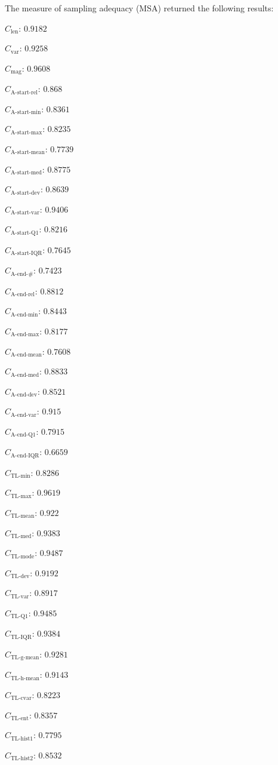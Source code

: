 \documentclass[a4paper]{article}
\newcommand{\magnitudename}{\text{mag}}
\newcommand{\magnitude}{C_{\magnitudename}}
\newcommand{\varietyname}{\text{var}}
\newcommand{\variety}{C_{\varietyname}}
\newcommand{\lengthname}{\text{len}}
\newcommand{\length}{C_{\lengthname}}
\newcommand{\startactivitiesrelname}{\text{A-start-rel}}
\newcommand{\startactivitiesrel}{C_{\startactivitiesrelname}}
\newcommand{\startminname}{\text{A-start-min}}
\newcommand{\startmin}{C_{\startminname}}
\newcommand{\startmaxname}{\text{A-start-max}}
\newcommand{\startmax}{C_{\startmaxname}}
\newcommand{\startmeanname}{\text{A-start-mean}}
\newcommand{\startmean}{C_{\startmeanname}}
\newcommand{\startmedianname}{\text{A-start-med}}
\newcommand{\startmedian}{C_{\startmedianname}}
\newcommand{\startdevname}{\text{A-start-dev}}
\newcommand{\startdev}{C_{\startdevname}}
\newcommand{\startvarname}{\text{A-start-var}}
\newcommand{\startvar}{C_{\startvarname}}
\newcommand{\startqonename}{\text{A-start-Q1}}
\newcommand{\startqone}{C_{\startqonename}}
\newcommand{\startiqrname}{\text{A-start-IQR}}
\newcommand{\startiqr}{C_{\startiqrname}}
\newcommand{\lastactivitiesname}{\text{A-end-\#}}
\newcommand{\lastactivities}{C_{\lastactivitiesname}}
\newcommand{\lastactivitiesrelname}{\text{A-end-rel}}
\newcommand{\lastactivitiesrel}{C_{\lastactivitiesrelname}}
\newcommand{\lastminname}{\text{A-end-min}}
\newcommand{\lastmin}{C_{\lastminname}}
\newcommand{\lastmaxname}{\text{A-end-max}}
\newcommand{\lastmax}{C_{\lastmaxname}}
\newcommand{\lastmeanname}{\text{A-end-mean}}
\newcommand{\lastmean}{C_{\lastmeanname}}
\newcommand{\lastmedianname}{\text{A-end-med}}
\newcommand{\lastmedian}{C_{\lastmedianname}}
\newcommand{\lastdevname}{\text{A-end-dev}}
\newcommand{\lastdev}{C_{\lastdevname}}
\newcommand{\lastvarname}{\text{A-end-var}}
\newcommand{\lastvar}{C_{\lastvarname}}
\newcommand{\lastqonename}{\text{A-end-Q1}}
\newcommand{\lastqone}{C_{\lastqonename}}
\newcommand{\lastiqrname}{\text{A-end-IQR}}
\newcommand{\lastiqr}{C_{\lastiqrname}}
\newcommand{\tlminname}{\text{TL-min}}
\newcommand{\tlmin}{C_{\tlminname}}
\newcommand{\tlavgname}{\text{TL-mean}}
\newcommand{\tlavg}{C_{\tlavgname}}
\newcommand{\tlmaxname}{\text{TL-max}}
\newcommand{\tlmax}{C_{\tlmaxname}}
\newcommand{\tlmedname}{\text{TL-med}}
\newcommand{\tlmed}{C_{\tlmedname}}
\newcommand{\tlmodename}{\text{TL-mode}}
\newcommand{\tlmode}{C_{\tlmodename}}
\newcommand{\tldevname}{\text{TL-dev}}
\newcommand{\tldev}{C_{\tldevname}}
\newcommand{\tlvarname}{\text{TL-var}}
\newcommand{\tlvar}{C_{\tlvarname}}
\newcommand{\tlqonename}{\text{TL-Q1}}
\newcommand{\tlqone}{C_{\tlqonename}}
\newcommand{\tliqrname}{\text{TL-IQR}}
\newcommand{\tliqr}{C_{\tliqrname}}
\newcommand{\tlgmeanname}{\text{TL-g-mean}}
\newcommand{\tlgmean}{C_{\tlgmeanname}}
\newcommand{\tlhmeanname}{\text{TL-h-mean}}
\newcommand{\tlhmean}{C_{\tlhmeanname}}
\newcommand{\tlcvariationname}{\text{TL-cvar}}
\newcommand{\tlcvariation}{C_{\tlcvariationname}}
\newcommand{\tlentropyname}{\text{TL-ent}}
\newcommand{\tlentropy}{C_{\tlentropyname}}
\newcommand{\tlhistonename}{\text{TL-hist1}}
\newcommand{\tlhistone}{C_{\tlhistonename}}
\newcommand{\tlhisttwoname}{\text{TL-hist2}}
\newcommand{\tlhisttwo}{C_{\tlhisttwoname}}
\begin{document}
\noindent
The measure of sampling adequacy (MSA) returned the following results:
\begin{compactitem}
\item $\length$: $0.9182$
\item $\variety$: $0.9258$
\item $\magnitude$: $0.9608$
\item $\startactivitiesrel$: $0.868$
\item $\startmin$: $0.8361$
\item $\startmax$: $0.8235$
\item $\startmean$: $0.7739$
\item $\startmedian$: $0.8775$
\item $\startdev$: $0.8639$
\item $\startvar$: $0.9406$
\item $\startqone$: $0.8216$
\item $\startiqr$: $0.7645$
\item $\lastactivities$: $0.7423$
\item $\lastactivitiesrel$: $0.8812$
\item $\lastmin$: $0.8443$
\item $\lastmax$: $0.8177$
\item $\lastmean$: $0.7608$
\item $\lastmedian$: $0.8833$
\item $\lastdev$: $0.8521$
\item $\lastvar$: $0.915$
\item $\lastqone$: $0.7915$
\item $\lastiqr$: $0.6659$
\item $\tlmin$: $0.8286$
\item $\tlmax$: $0.9619$
\item $\tlavg$: $0.922$
\item $\tlmed$: $0.9383$
\item $\tlmode$: $0.9487$
\item $\tldev$: $0.9192$
\item $\tlvar$: $0.8917$
\item $\tlqone$: $0.9485$
\item $\tliqr$: $0.9384$
\item $\tlgmean$: $0.9281$
\item $\tlhmean$: $0.9143$
\item $\tlcvariation$: $0.8223$
\item $\tlentropy$: $0.8357$
\item $\tlhistone$: $0.7795$
\item $\tlhisttwo$: $0.8532$

\end{compactitem}
\end{document}

